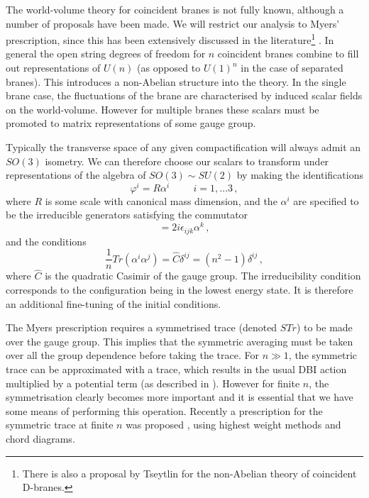 The world-volume theory for coincident branes is not fully known, although
a number of proposals have been made. We will restrict our analysis to Myers' 
prescription, since this has been extensively discussed in the 
literature\footnote{There is also a proposal by Tseytlin \cite{Tseytlin}
for the non-Abelian theory of coincident D-branes.} \cite{myers1, myers2}. 
In general the open string degrees of freedom for $n$ coincident branes 
combine to fill out representations of $U(n)$ (as opposed to $U(1)^n$ 
in the case of separated branes). This introduces a non-Abelian 
structure into the theory. In the single brane case, the fluctuations of the 
brane are characterised by induced scalar fields on the world-volume. 
However for multiple branes
these scalars must be promoted to matrix representations of some gauge group. 


Typically the transverse space of any given compactification will always admit
an $SO(3)$ isometry. We can therefore choose our scalars to 
transform under representations of the algebra of $SO(3) \sim SU(2)$ by making 
the identifications
% 
\begin{equation}
\varphi^i = R \alpha^i \hspace{1cm} i =1,  \ldots 3 \,,
\end{equation}
% 
where $R$ is some scale with canonical mass dimension, and the $\alpha^i$ are
specified to be the irreducible generators satisfying the commutator
% 
\begin{equation}
[\alpha^i, \alpha^j] = 2i \epsilon_{ijk} \alpha^k \,,
\end{equation}
% 
and the conditions
% 
\begin{equation}
\frac{1}{n} Tr(\alpha^i \alpha^j) = \hat{C} \delta^{ij} = (n^2-1) \delta^{ij}
\,,
\end{equation}
% 
where $\hat{C}$ is the quadratic Casimir of the gauge group.
The irreducibility condition corresponds to the configuration being in the
lowest energy state. It is therefore an additional fine-tuning
of the initial conditions. 


The Myers prescription requires a symmetrised trace (denoted $STr$) to 
be made over the gauge group. This implies that 
the symmetric averaging must be taken over all the group dependence 
before taking the trace. For $n \gg 1$, the symmetric trace can be approximated with a trace, 
which results in the usual DBI action multiplied by a potential term (as
described in \cite{thomasward, Kachru:2002gs}). 
However for finite $n$, the symmetrisation clearly becomes more important and it is essential that
we
have some means of performing this operation. Recently
a prescription for the symmetric trace at finite $n$ was proposed \cite{Ramgoolam:2004gw,
McNamara:2005ry}, 
using highest weight methods and chord diagrams. 

